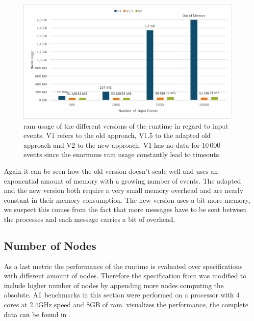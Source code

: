 \begin{figure}
  \includegraphics[width=\textwidth]{gfx/runtime_ram_usage_benchmark}
  \caption[\gls{ram} usage of the different versions of the runtime]{\gls{ram} usage of the different versions of the runtime in regard to input events. V1 refers to the old approach, V1.5 to the adapted old approach and V2 to the new approach. V1 has no data for 10\,000 events since the enormous \gls{ram} usage constantly lead to timeouts.}
\label{fig:chap_eval:runtime_ram_usage}
\end{figure}

Again it can be seen how the old version doesn't scale well and uses an exponential amount of memory with a growing number of events.
The adapted and the new version both require a very small memory overhead and are nearly constant in their memory consumption.
The new version uses a bit more memory, we suspect this comes from the fact that more messages have to be sent between the processes and each message carries a bit of overhead.

\subsection{Number of Nodes}

As a last metric the performance of the runtime is evaluated over specifications with different amount of nodes.
Therefore the specification from  was modified to include higher number of nodes by appending more nodes computing the absolute.
All benchmarks in this section were performed on a processor with 4 cores at 2.4GHz speed and 8GB of \gls{ram}.
 visualizes the performance, the complete data can be found in .

